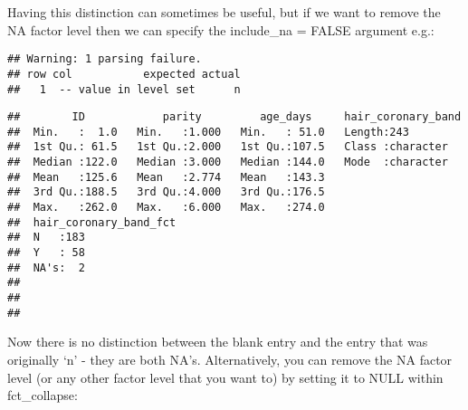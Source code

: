\documentclass[
]{article}
\newenvironment{Shaded}{\begin{snugshade}}{\end{snugshade}}
\newcommand{\DataTypeTok}[1]{\textcolor[rgb]{0.13,0.29,0.53}{#1}}
\newcommand{\KeywordTok}[1]{\textcolor[rgb]{0.13,0.29,0.53}{\textbf{#1}}}
\newcommand{\NormalTok}[1]{#1}
\newcommand{\OperatorTok}[1]{\textcolor[rgb]{0.81,0.36,0.00}{\textbf{#1}}}
\newcommand{\OtherTok}[1]{\textcolor[rgb]{0.56,0.35,0.01}{#1}}
\newcommand{\StringTok}[1]{\textcolor[rgb]{0.31,0.60,0.02}{#1}}
\begin{document}
Having this distinction can sometimes be useful, but if we want to
remove the NA factor level then we can specify the include\_na = FALSE
argument e.g.:

\begin{Shaded}
\end{Shaded}

\begin{verbatim}
## Warning: 1 parsing failure.
## row col           expected actual
##   1  -- value in level set      n
\end{verbatim}

\begin{Shaded}
\end{Shaded}

\begin{verbatim}
##        ID            parity         age_days     hair_coronary_band
##  Min.   :  1.0   Min.   :1.000   Min.   : 51.0   Length:243        
##  1st Qu.: 61.5   1st Qu.:2.000   1st Qu.:107.5   Class :character  
##  Median :122.0   Median :3.000   Median :144.0   Mode  :character  
##  Mean   :125.6   Mean   :2.774   Mean   :143.3                     
##  3rd Qu.:188.5   3rd Qu.:4.000   3rd Qu.:176.5                     
##  Max.   :262.0   Max.   :6.000   Max.   :274.0                     
##  hair_coronary_band_fct
##  N   :183              
##  Y   : 58              
##  NA's:  2              
##                        
##                        
## 
\end{verbatim}

Now there is no distinction between the blank entry and the entry that
was originally `n' - they are both NA's. Alternatively, you can remove
the NA factor level (or any other factor level that you want to) by
setting it to NULL within fct\_collapse:
\end{document}
